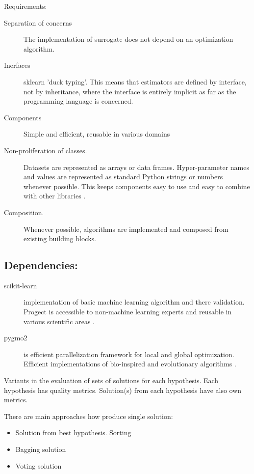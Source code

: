 Requirements:
\begin{description}
    \item[Separation of concerns] The implementation of surrogate does not depend on an optimization algorithm. 
    \item[Inerfaces] sklearn 'duck typing'. This means that estimators are defined by interface, not by inheritance, where the interface is entirely implicit as far as the programming language is concerned.
    \item[Components] Simple and efficient, reusable in various domains \cite{buitinck2013api} 
    \item[Non-proliferation of classes.] Datasets are represented as arrays or data frames. Hyper-parameter names and values are represented as standard Python strings or numbers whenever possible. This keeps components easy to use and easy to combine with other libraries \cite{buitinck2013api}.
    \item[Composition.] Whenever possible, algorithms are implemented and composed from existing building blocks.
\end{description}


\subsection{Dependencies:}
\begin{description}
    \item[scikit-learn] implementation of basic machine learning algorithm and there validation. Progect is accessible to non-machine learning experts and reusable in various scientific areas \cite{art-scikit-learn}.
    \item[pygmo2] is efficient parallelization framework for local and global optimization. Efficient implementations of bio-inspired and evolutionary algorithms \cite{francesco_biscani_2019}.
\end{description}


Variants in the evaluation of sets of solutions for each hypothesis. Each hypothesis has quality metrics. Solution(s) from each hypothesis have also own metrics.
               
There are main approaches how produce single solution: 
\begin{itemize}
    \item Solution from best hypothesis. Sorting
    \item Bagging solution
    \item Voting solution                
\end{itemize}


